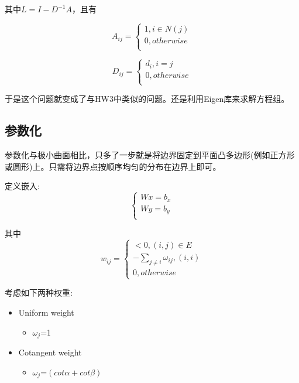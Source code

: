 \documentclass{article}
\begin{document}
	其中$L=I-D^{-1}A$，且有
	
		$$ A_{ij}=\left\{ 
	\begin{array}{lc}
		1 , i \in N(j) \\
	    0 , otherwise     \\
	\end{array}
	\right.$$
	
		$$ D_{ij}=\left\{ 
	\begin{array}{lc}
		d_i , i=j  \\
		0, otherwise  \\
	\end{array}
	\right.$$
	
	于是这个问题就变成了与HW3中类似的问题。还是利用Eigen库来求解方程组。
	
	\subsection{参数化}
    
    参数化与极小曲面相比，只多了一步就是将边界固定到平面凸多边形(例如正方形或圆形)上。只需将边界点按顺序均匀的分布在边界上即可。
    
    定义嵌入:
    	$$\left\{ 
    \begin{array}{lc}
    	Wx=b_x \\
    Wy=b_y   \\
    \end{array}
    \right.$$
    
    其中
    $$ w_{ij}=\left\{ 
    \begin{array}{lc}
    	< 0 , (i,j)\in E   \\
    	-\sum_{j\ne i}\omega_{ij} ,(i,i) \\
    	0, otherwise 
    \end{array}
    \right.$$
    
    考虑如下两种权重:
    	\begin{itemize}
    	\item Uniform weight 
    		\begin{itemize}[label=$\circ$, itemjoin=\hspace{0.5em}]
    		\item $\omega_j$=1
 
    	\end{itemize}
    	\item Cotangent weight
    		\begin{itemize}[label=$\circ$, itemjoin=\hspace{0.5em}]
    		\item $\omega_j$=$(cot\alpha+cot\beta)$
    	\end{itemize}
    \end{itemize}
\end{document}
